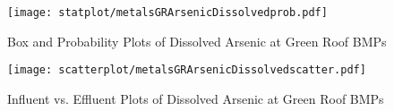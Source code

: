         \begin{figure}[hb]   %
            \centering
            \texttt{[image: statplot/metalsGRArsenicDissolvedprob.pdf]}
            \caption{Box and Probability Plots of Dissolved Arsenic at Green Roof BMPs}
        \end{figure}         %
        
        
        \begin{figure}[hb]   %
            \centering
            \texttt{[image: scatterplot/metalsGRArsenicDissolvedscatter.pdf]}
            \caption{Influent vs. Effluent Plots of Dissolved Arsenic at Green Roof BMPs}
        \end{figure}         %
        \clearpage
        